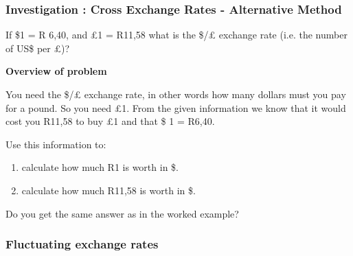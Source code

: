 \label{m39335*secfhsst!!!underscore!!!id841}
            \subsubsection{  Investigation : Cross Exchange Rates - Alternative Method }
            \nopagebreak
            
        \label{m39335*id68438}If \$1 = R
6,40, and £1 = R11,58 what is the \$/£ exchange rate (i.e. the
number of US\$ per £)?\par 
        \label{m39335*id68445}
          \textbf{Overview of problem}
        \par 
        \label{m39335*id68454}You need the \$/£ exchange rate, in other words how many dollars must you pay for a pound. So you need £1. From the given information we know that it would cost you R11,58 to buy £1 and that \$ 1 = R6,40.\par 
        \label{m39335*id68463}Use this information to:\par 
        \label{m39335*id68466}\begin{enumerate}[noitemsep, label=\textbf{\arabic*}. ] 
            \label{m39335*uid15}\item calculate how much R1 is worth in \$.
\label{m39335*uid16}\item calculate how much R11,58 is worth in \$.
\end{enumerate}
        
        \label{m39335*id68496}Do you get the same answer as in the worked example? \par 

      
      \label{m39335*uid17}
            \subsubsection{ Fluctuating exchange rates}
            \nopagebreak
            
